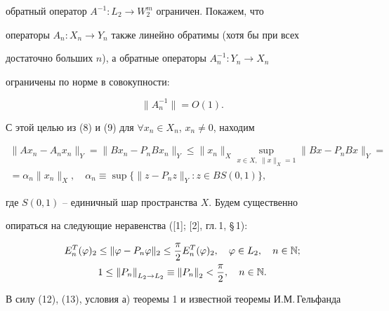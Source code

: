 \begin{pf}
обратный оператор $A^{-1}:L_2 \to W_2^m$ ограничен. Покажем, что


операторы $A_n:X_n \to Y_n$ также линейно обратимы (хотя бы при всех


достаточно больших $n$), а обратные операторы $A_n^{-1}:Y_n \to X_n$


ограничены по норме в совокупности:


\begin{equation}


\| A_n^{-1} \|=O(1).


\end{equation}





С этой целью из (8) и (9) для $\forall x_n \in X_n$, $x_n \neq 0$, находим


\begin{multline}


\| Ax_n - A_nx_n \|_Y=\| Bx_n - P_nBx_n


\|_Y \leq \| x_n \|_X \sup_{x \in X,\; \| x \|_X=1}


\| Bx-P_nBx \|_Y=\\


%


=\alpha_n \| x_n \|_X, \quad \alpha_n \equiv \sup


\lbrace \| z-P_nz \|_Y:z \in BS(0,1) \rbrace,


\end{multline}


где $S(0,1)$ -- единичный шар пространства $X$. Будем существенно


опираться на следующие неравенства ([1]; [2], гл.\,1, \S\,1):


\begin{gather}


E_n^T( \varphi)_2 \leq \| \varphi - P_n \varphi \|_2 \leq \frac{\pi}{2} E_n^T


( \varphi)_2, \quad \varphi \in L_2,\quad n\in\N; \\


%


1 \leq {\| P_n \|}_{L_2 \to L_2} \equiv {\| P_n \|}_2 < \frac


{\pi}{2}, \quad n\in\N.


\end{gather}





В силу (12), (13), условия а) теоремы 1 и известной теоремы И.М.\,Гельфанда



\end{pf}
